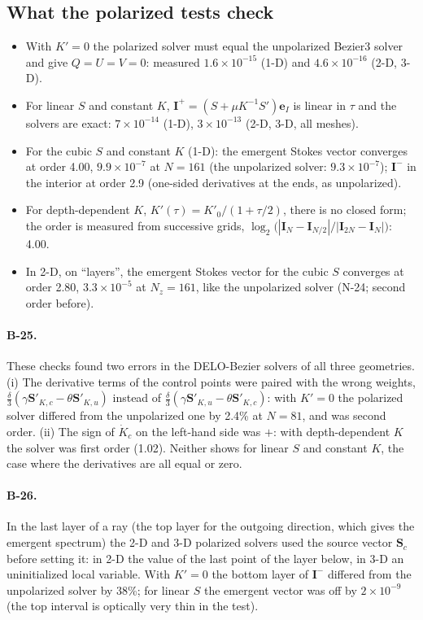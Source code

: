 \documentclass[11pt,a4paper]{article}
\newcommand{\Kp}{K'}
\newcommand{\vI}{\boldsymbol{I}}
\newcommand{\vS}{\boldsymbol{S}}
\newcommand{\eI}{\boldsymbol{e}_I}
\begin{document}
\subsection{What the polarized tests check}
\begin{itemize}
\item With $\Kp=0$ the polarized solver must equal the unpolarized
  Bezier3 solver and give $Q=U=V=0$: measured $1.6\times10^{-15}$ (1-D)
  and $4.6\times10^{-16}$ (2-D, 3-D).
\item For linear $S$ and constant $K$, $\vI^+ = (S + \mu K^{-1}S')\eI$ is
  linear in $\tau$ and the solvers are exact: $7\times10^{-14}$ (1-D),
  $3\times10^{-13}$ (2-D, 3-D, all meshes).
\item For the cubic $S$ and constant $K$ (1-D): the emergent Stokes
  vector converges at order 4.00, $9.9\times10^{-7}$ at $N=161$ (the
  unpolarized solver: $9.3\times10^{-7}$); $\vI^-$ in the interior at
  order 2.9 (one-sided derivatives at the ends, as unpolarized).
\item For depth-dependent $K$, $\Kp(\tau) = \Kp_0/(1+\tau/2)$, there is
  no closed form; the order is measured from successive grids,
  $\log_2\bigl(|\vI_N-\vI_{N/2}|/|\vI_{2N}-\vI_N|\bigr)$: 4.00.
\item In 2-D, on ``layers'', the emergent Stokes vector for the cubic $S$
  converges at order 2.80, $3.3\times10^{-5}$ at $N_z=161$, like the
  unpolarized solver (N-24; second order before).
\end{itemize}

\paragraph{B-25.} These checks found two errors in the DELO-Bezier
solvers of all three geometries. (i) The derivative terms of the control
points were paired with the wrong weights,
$\tfrac\delta3(\gamma\vS'_{K,c}-\theta\vS'_{K,u})$ instead of
$\tfrac\delta3(\gamma\vS'_{K,u}-\theta\vS'_{K,c})$: with $\Kp=0$ the
polarized solver differed from the unpolarized one by 2.4\% at $N=81$,
and was second order. (ii) The sign of $\dot K_c$ on the left-hand side
was $+$: with depth-dependent $K$ the solver was first order (1.02).
Neither shows for linear $S$ and constant $K$, the case where the
derivatives are all equal or zero.

\paragraph{B-26.} In the last layer of a ray (the top layer for the
outgoing direction, which gives the emergent spectrum) the 2-D and 3-D
polarized solvers used the source vector $\vS_c$ before setting it: in
2-D the value of the last point of the layer below, in 3-D an
uninitialized local variable. With $\Kp=0$ the bottom layer of $\vI^-$
differed from the unpolarized solver by 38\%; for linear $S$ the
emergent vector was off by $2\times10^{-9}$ (the top interval is
optically very thin in the test).
\end{document}

